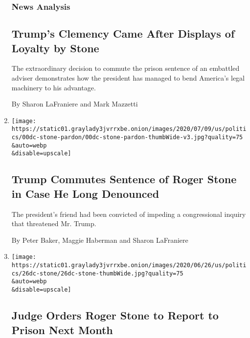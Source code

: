 \begin{enumerate}
  \hypertarget{news-analysis}{%
  \subsubsection{News Analysis}\label{news-analysis}}

  \hypertarget{trumps-clemency-came-after-displays-of-loyalty-by-stone}{%
  \subsection{Trump's Clemency Came After Displays of Loyalty by
  Stone}\label{trumps-clemency-came-after-displays-of-loyalty-by-stone}}

  The extraordinary decision to commute the prison sentence of an
  embattled adviser demonstrates how the president has managed to bend
  America's legal machinery to his advantage.

  By Sharon LaFraniere and Mark Mazzetti
\item
  \href{/2020/07/10/us/politics/trump-roger-stone-clemency.html}{}

  \texttt{[image: https://static01.graylady3jvrrxbe.onion/images/2020/07/09/us/politics/00dc-stone-pardon/00dc-stone-pardon-thumbWide-v3.jpg?quality=75\\\&auto=webp\\\&disable=upscale]}

  \hypertarget{trump-commutes-sentence-of-roger-stone-in-case-he-long-denounced}{%
  \subsection{Trump Commutes Sentence of Roger Stone in Case He Long
  Denounced}\label{trump-commutes-sentence-of-roger-stone-in-case-he-long-denounced}}

  The president's friend had been convicted of impeding a congressional
  inquiry that threatened Mr. Trump.

  By Peter Baker, Maggie Haberman and Sharon LaFraniere
\item
  \href{/2020/06/26/us/politics/roger-stone-prison.html}{}

  \texttt{[image: https://static01.graylady3jvrrxbe.onion/images/2020/06/26/us/politics/26dc-stone/26dc-stone-thumbWide.jpg?quality=75\\\&auto=webp\\\&disable=upscale]}

  \hypertarget{judge-orders-roger-stone-to-report-to-prison-next-month}{%
  \subsection{Judge Orders Roger Stone to Report to Prison Next
  Month}\label{judge-orders-roger-stone-to-report-to-prison-next-month}}


\end{enumerate}
